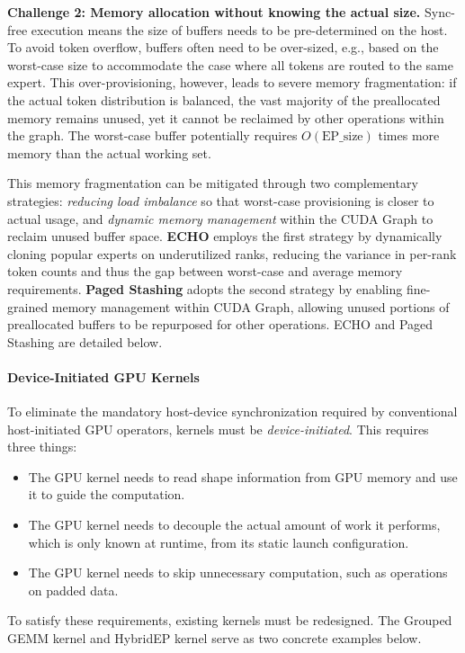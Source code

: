 \textbf{Challenge 2: Memory allocation without knowing the actual size.}
Sync-free execution means the size of buffers needs to be pre-determined on the host. To avoid token overflow, buffers often need to be over-sized, e.g., based on the worst-case size to accommodate the case where all tokens are routed to the same expert. This over-provisioning, however, leads to severe memory fragmentation: if the actual token distribution is balanced, the vast majority of the preallocated memory remains unused, yet it cannot be reclaimed by other operations within the graph. The worst-case buffer potentially requires $O(\text{EP\_size})$ times more memory than the actual working set.

This memory fragmentation can be mitigated through two complementary strategies: \emph{reducing load imbalance} so that worst-case provisioning is closer to actual usage, and \emph{dynamic memory management} within the CUDA Graph to reclaim unused buffer space. \textbf{ECHO} employs the first strategy by dynamically cloning popular experts on underutilized ranks, reducing the variance in per-rank token counts and thus the gap between worst-case and average memory requirements. \textbf{Paged Stashing} adopts the second strategy by enabling fine-grained memory management within CUDA Graph, allowing unused portions of preallocated buffers to be repurposed for other operations. ECHO and Paged Stashing are detailed below.

\paragraph{Device-Initiated GPU Kernels}
\label{sec:device-init}

To eliminate the mandatory host-device synchronization required by conventional host-initiated GPU operators, kernels must be \emph{device-initiated}. This requires three things:
\begin{itemize}
\item[i.] The GPU kernel needs to read shape information from GPU memory and use it to guide the computation.
\item[ii.] The GPU kernel needs to decouple the actual amount of work it performs, which is only known at runtime, from its static launch configuration.
\item[iii.] The GPU kernel needs to skip unnecessary computation, such as operations on padded data.
\end{itemize}
To satisfy these requirements, existing kernels must be redesigned. The Grouped GEMM kernel and HybridEP kernel serve as two concrete examples below.

